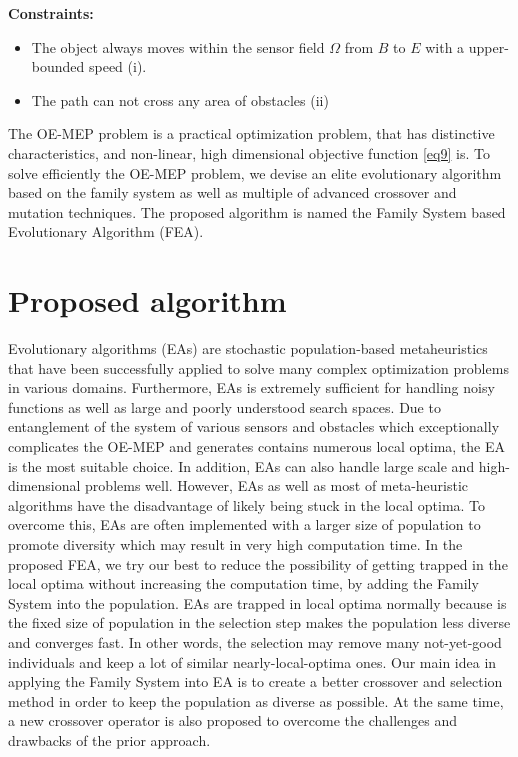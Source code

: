 \documentclass[final]{elsarticle}
\begin{document}
\textbf{Constraints:}	
\begin{itemize}
	\item The object always moves within the sensor field $\Omega $ from $B$ to $E$ with a upper-bounded speed (i).
	\item The path can not cross any area of obstacles  (ii)
\end{itemize}
	
The OE-MEP problem is a practical optimization problem, that has distinctive characteristics, and non-linear, high dimensional objective function \eqref{eq9} is. To solve efficiently the OE-MEP problem, we devise an elite evolutionary algorithm based on the family system as well as multiple of advanced crossover and mutation techniques. The proposed algorithm is named the Family System based Evolutionary Algorithm (FEA).

\section{Proposed algorithm}
Evolutionary algorithms (EAs) are stochastic population-based metaheuristics that have been successfully applied to solve many complex optimization problems in various domains. Furthermore, EAs is extremely sufficient for handling noisy functions as well as large and poorly understood search spaces. Due to entanglement of the system of various sensors and obstacles which exceptionally complicates the OE-MEP and generates contains numerous local optima, the EA is the most suitable choice. In addition, EAs can also handle large scale and high-dimensional problems well. However, EAs as well as most of meta-heuristic algorithms have the disadvantage of likely being stuck in the local optima. To overcome this, EAs are often implemented with a larger size of population to promote diversity which may result in very high computation time. In the proposed FEA, we try our best to reduce the possibility of getting trapped in the local optima without increasing the computation time, by adding the Family System into the population. EAs are trapped in local optima normally because is the fixed size of population in the selection step makes the population less diverse and converges fast. In other words, the selection may remove many not-yet-good individuals and keep a lot of similar nearly-local-optima ones. Our main idea in applying the Family System into EA is to create a better crossover and selection method in order to keep the population as diverse as possible. At the same time, a new crossover operator is also proposed to overcome the challenges and drawbacks of the prior approach.
\end{document}
